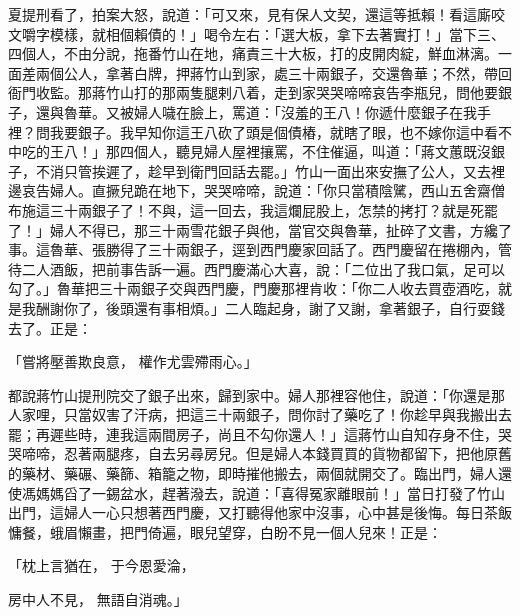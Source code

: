 \begin{showcontents}{}
夏提刑看了，拍案大怒，說道：「可又來，見有保人文契，還這等抵賴！看這廝咬文嚼字模樣，就相個賴債的！」喝令左右：「選大板，拿下去著實打！」當下三、四個人，不由分說，拖番竹山在地，痛責三十大板，打的皮開肉綻，鮮血淋漓。一面差兩個公人，拿著白牌，押蔣竹山到家，處三十兩銀子，交還魯華；不然，帶回衙門收監。那蔣竹山打的那兩隻腿剌八着，走到家哭哭啼啼哀告李瓶兒，問他要銀子，還與魯華。又被婦人噦在臉上，罵道：「沒羞的王八！你遞什麼銀子在我手裡？問我要銀子。我早知你這王八砍了頭是個債樁，就瞎了眼，也不嫁你這中看不中吃的王八！」那四個人，聽見婦人屋裡攘罵，不住催逼，叫道：「蔣文蕙既沒銀子，不消只管挨遲了，趁早到衛門回話去罷。」竹山一面出來安撫了公人，又去裡邊哀告婦人。直撅兒跪在地下，哭哭啼啼，說道：「你只當積陰騭，西山五舍齋僧布施這三十兩銀子了！不與，這一回去，我這爛屁股上，怎禁的拷打？就是死罷了！」婦人不得已，那三十兩雪花銀子與他，當官交與魯華，扯碎了文書，方纔了事。這魯華、張勝得了三十兩銀子，逕到西門慶家回話了。西門慶留在捲棚內，管待二人酒飯，把前事告訴一遍。西門慶滿心大喜，說：「二位出了我口氣，足可以勾了。」魯華把三十兩銀子交與西門慶，門慶那裡肯收：「你二人收去買壺酒吃，就是我酬謝你了，後頭還有事相煩。」二人臨起身，謝了又謝，拿著銀子，自行耍錢去了。正是：

「嘗將壓善欺良意，  權作尤雲殢雨心。」

都說蔣竹山提刑院交了銀子出來，歸到家中。婦人那裡容他住，說道：「你還是那人家哩，只當奴害了汗病，把這三十兩銀子，問你討了藥吃了！你趁早與我搬出去罷；再遲些時，連我這兩間房子，尚且不勾你還人！」這蔣竹山自知存身不住，哭哭啼啼，忍著兩腿疼，自去另尋房兒。但是婦人本錢買買的貨物都留下，把他原舊的藥材、藥碾、藥篩、箱籠之物，即時摧他搬去，兩個就開交了。臨出門，婦人還使馮媽媽舀了一錫盆水，趕著潑去，說道：「喜得冤家離眼前！」當日打發了竹山出門，這婦人一心只想著西門慶，又打聽得他家中沒事，心中甚是後悔。每日茶飯慵餐，蛾眉懶畫，把門倚遍，眼兒望穿，白盼不見一個人兒來！正是：

「枕上言猶在，  于今恩愛淪，

房中人不見，  無語自消魂。」


\end{showcontents}
